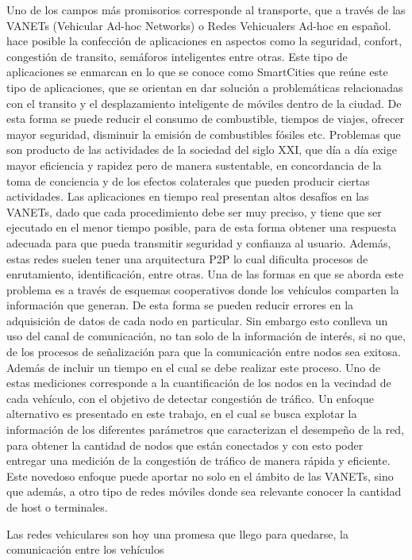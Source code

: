 Uno de los campos más promisorios corresponde al transporte, que a través de las VANETs (Vehicular Ad-hoc Networks) o Redes Vehicualers Ad-hoc en español. hace posible la confección de aplicaciones en aspectos como la seguridad, confort, congestión de transito, semáforos inteligentes entre otras. Este tipo de aplicaciones se enmarcan en lo que se conoce como SmartCities que reúne este tipo de aplicaciones, que se orientan en dar solución a problemáticas relacionadas con el transito y el desplazamiento inteligente de móviles dentro de la ciudad. De esta forma se puede reducir el consumo de combustible, tiempos de viajes, ofrecer mayor seguridad, disminuir la emisión de combustibles fósiles etc. Problemas que son producto de las actividades de la sociedad del siglo XXI, que día a día exige mayor eficiencia y rapidez pero de manera sustentable, en concordancia de la toma de conciencia y de los efectos colaterales que pueden producir ciertas actividades.
Las aplicaciones en tiempo real presentan altos desafíos en las VANETs, dado que cada procedimiento debe ser muy preciso, y tiene que ser ejecutado en el menor tiempo posible, para de esta forma obtener una respuesta adecuada para que pueda transmitir seguridad y confianza al usuario. Además, estas redes suelen tener una arquitectura P2P lo cual dificulta procesos de enrutamiento, identificación, entre otras.
Una de las formas en que se aborda este problema es a través de esquemas cooperativos donde los vehículos comparten la información que generan. De esta forma se pueden reducir errores en la adquisición de datos de cada nodo en particular. Sin embargo esto conlleva un uso del canal de comunicación, no tan solo de la información de interés, si no que, de los procesos de señalización para que la comunicación entre nodos sea exitosa. Además de incluir un tiempo en el cual se debe realizar este proceso.
Uno de estas mediciones corresponde a la cuantificación de los nodos en la vecindad de cada vehículo, con el objetivo de detectar congestión de tráfico. Un enfoque alternativo es presentado en este trabajo, en el cual se busca explotar la información de los diferentes parámetros que caracterizan el desempeño de la red, para obtener la cantidad de nodos que están conectados y con esto poder entregar una medición de la congestión de tráfico de manera rápida y eficiente.
Este novedoso enfoque puede aportar no solo en el ámbito de las VANETs, sino que además, a otro tipo de redes móviles donde sea relevante conocer la cantidad de host o terminales. 

Las redes vehiculares son hoy una promesa que llego para quedarse, la comunicación entre los vehículos

